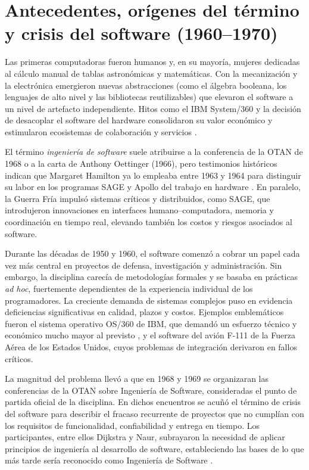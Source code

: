 \documentclass[conference]{IEEEtran}
\begin{document}
\section{Antecedentes, orígenes del término y crisis del software (1960--1970)}

Las primeras computadoras fueron humanos y, en su mayoría, mujeres dedicadas al cálculo manual de tablas astronómicas y matemáticas. Con la mecanización y la electrónica emergieron nuevas abstracciones (como el álgebra booleana, los lenguajes de alto nivel y las bibliotecas reutilizables) que elevaron el software a un nivel de artefacto independiente. Hitos como el IBM System/360 y la decisión de desacoplar el software del hardware consolidaron su valor económico y estimularon ecosistemas de colaboración y servicios \cite{booch2018history}.

El término \emph{ingeniería de software} suele atribuirse a la conferencia de la OTAN de 1968 o a la carta de Anthony Oettinger (1966), pero testimonios históricos indican que Margaret Hamilton ya lo empleaba entre 1963 y 1964 para distinguir su labor en los programas SAGE y Apollo del trabajo en hardware \cite{booch2018history}. En paralelo, la Guerra Fría impulsó sistemas críticos y distribuidos, como SAGE, que introdujeron innovaciones en interfaces humano--computadora, memoria y coordinación en tiempo real, elevando también los costos y riesgos asociados al software.

Durante las décadas de 1950 y 1960, el software comenzó a cobrar un papel cada vez más central en proyectos de defensa, investigación y administración. Sin embargo, la disciplina carecía de metodologías formales y se basaba en prácticas \textit{ad hoc}, fuertemente dependientes de la experiencia individual de los programadores. La creciente demanda de sistemas complejos puso en evidencia deficiencias significativas en calidad, plazos y costos. Ejemplos emblemáticos fueron el sistema operativo OS/360 de IBM, que demandó un esfuerzo técnico y económico mucho mayor al previsto \cite{brooks1975}, y el software del avión F-111 de la Fuerza Aérea de los Estados Unidos, cuyos problemas de integración derivaron en fallos críticos.

La magnitud del problema llevó a que en 1968 y 1969 se organizaran las conferencias de la OTAN sobre Ingeniería de Software, consideradas el punto de partida oficial de la disciplina. En dichos encuentros se acuñó el término de crisis del software para describir el fracaso recurrente de proyectos que no cumplían con los requisitos de funcionalidad, confiabilidad y entrega en tiempo. Los participantes, entre ellos Dijkstra y Naur, subrayaron la necesidad de aplicar principios de ingeniería al desarrollo de software, estableciendo las bases de lo que más tarde sería reconocido como Ingeniería de Software \cite{booch2018history}.
\end{document}
